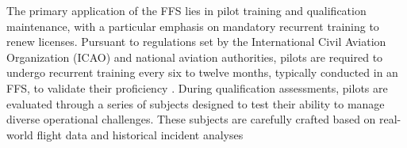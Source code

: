 \documentclass[opre,sglanonrev]{informs4}
\begin{document}
The primary application of the FFS lies in pilot training and qualification maintenance, with a particular emphasis on mandatory recurrent training to renew licenses. Pursuant to regulations set by the International Civil Aviation Organization (ICAO) and national aviation authorities, pilots are required to undergo recurrent training every six to twelve months, typically conducted in an FFS, to validate their proficiency \citep{Flightradar2024}.
During qualification assessments, pilots are evaluated through a series of subjects designed to test their ability to manage diverse operational challenges. These subjects are carefully crafted based on real-world flight data and historical incident analyses%
\end{document}
